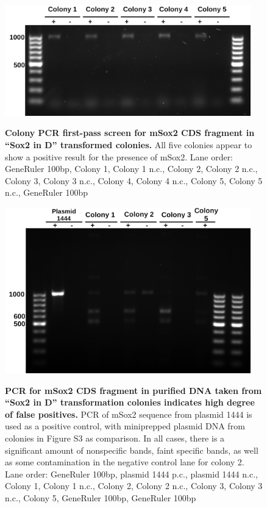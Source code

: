 \documentclass[withindex,glossary]{cam-thesis}
\begin{document}
\begin{figure}[htbp]
\centering
\includegraphics[width=0.95\textwidth]{figs/FigS3_Feb08-D colony PCR for Sox2 false positives.png}
\label{figS3}
\caption{\textbf{Colony PCR first-pass screen for mSox2 CDS fragment in ``Sox2 in D'' transformed colonies.} All five colonies appear to show a positive result for the presence of mSox2. Lane order: GeneRuler 100bp, Colony 1, Colony 1 n.c., Colony 2, Colony 2 n.c., Colony 3, Colony 3 n.c., Colony 4, Colony 4 n.c., Colony 5, Colony 5 n.c., GeneRuler 100bp}
\end{figure}

\begin{figure}[htbp]
\centering
\includegraphics[width=0.95\textwidth]{figs/FigS4_Feb13-D colony frag 2 miniprepped PCR.png}
\label{figS4}
\caption{\textbf{PCR for mSox2 CDS fragment in purified DNA taken from ``Sox2 in D'' transformation colonies indicates high degree of false positives.} PCR of mSox2 sequence from plasmid 1444 is used as a positive control, with miniprepped plasmid DNA from colonies in Figure S3 as comparison. In all cases, there is a significant amount of nonspecific bands, faint specific bands, as well as some contamination in the negative control lane for colony 2. Lane order: GeneRuler 100bp, plasmid 1444 p.c., plasmid 1444 n.c., Colony 1, Colony 1 n.c., Colony 2, Colony 2 n.c., Colony 3, Colony 3 n.c., Colony 5, GeneRuler 100bp, GeneRuler 100bp}
\end{figure}
\end{document}
